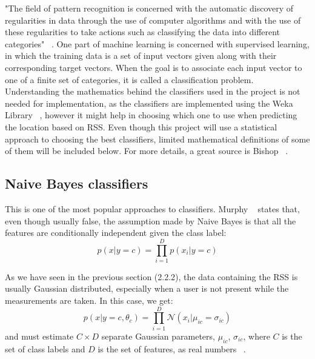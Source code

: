 "The field of pattern recognition is concerned with the automatic discovery of regularities in data through the use of computer algorithms and with the use of these regularities to take actions such as classifying the data into different categories" ~\cite{Bishop}.
One part of machine learning is concerned with supervised learning, in which the training data is a set of input vectors given along with their corresponding target vectors. When the goal is to associate each input vector to one of a finite set of categories, it is called a classification problem. Understanding the mathematics behind the classifiers used in the project is not needed for implementation, as the classifiers are implemented using the Weka Library ~\cite{Weka}, however it might help in choosing which one to use when predicting the location based on RSS. Even though this project will use a statistical approach to choosing the best classifiers, limited mathematical definitions of some of them will be included below. For more details, a great source is Bishop ~\cite{Bishop}.

\subsection{Naive Bayes classifiers}
This is one of the most popular approaches to classifiers. Murphy ~\cite{Murphy} states that, even though usually false, the assumption made by Naive Bayes is that all the features are conditionally independent given the class label:
$$ p(x|y = c) = \prod\limits_{i=1}^D p(x_i|y = c) $$

As we have seen in the previous section (2.2.2), the data containing the RSS is usually Gaussian distributed, especially when a user is not present while the measurements are taken. In this case, we get:
$$ p(x|y = c,\theta_c) = \prod\limits_{i=1}^D \mathcal{N}(x_i|\mu_{ic} = \sigma_{ic}) $$ and must estimate $C \times D$ separate Gaussian parameters, $\mu_{ic}$, $\sigma_{ic}$, where $C$ is the set of class labels and $D$ is the set of features, as real numbers ~\cite{Murphy}.

